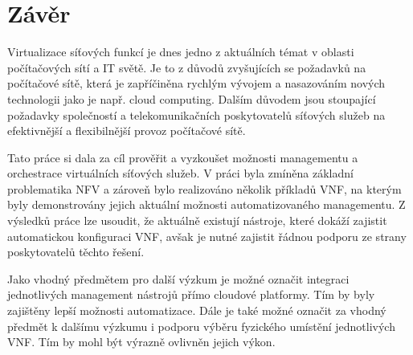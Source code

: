 \chapter{Závěr}

Virtualizace síťových funkcí je dnes jedno z aktuálních témat v oblasti počítačových sítí a IT světě. Je to z důvodů zvyšujících se požadavků na počítačové sítě, která je zapříčiněna rychlým vývojem a nasazováním nových technologii jako je např. cloud computing. Dalším důvodem jsou stoupající požadavky společností a telekomunikačních poskytovatelů síťových služeb na efektivnější a flexibilnější provoz počítačové sítě. 

Tato práce si dala za cíl prověřit a vyzkoušet možnosti managementu a orchestrace virtuálních síťových služeb. V práci byla zmíněna základní problematika NFV a zároveň bylo realizováno několik příkladů VNF, na kterým byly demonstrovány jejich aktuální možnosti automatizovaného managementu. Z výsledků práce lze usoudit, že aktuálně existují nástroje, které dokáží zajistit automatickou konfiguraci VNF, avšak je nutné zajistit řádnou podporu ze strany poskytovatelů těchto řešení.   

Jako vhodný předmětem pro další výzkum je možné označit integraci jednotlivých management nástrojů přímo cloudové platformy. Tím by byly zajištěny lepší možnosti automatizace. Dále je také možné označit za vhodný předmět k dalšímu výzkumu i podporu výběru fyzického umístění jednotlivých VNF. Tím by mohl být výrazně ovlivněn jejich výkon.